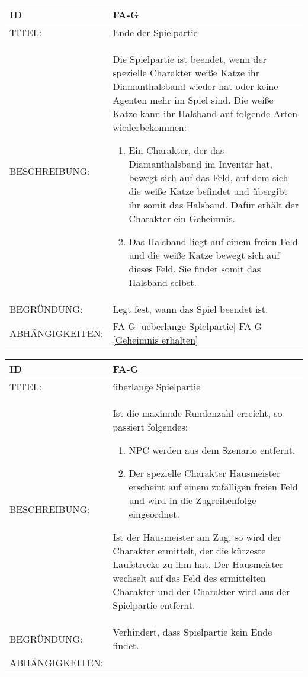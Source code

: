 \begin{tabularx}{16cm}{l|X}
	{table}\label{Ende der Spielpartie}
	\textbf{ID} & \textbf{FA-G \arabic{table}} \\
	\hline
	TITEL: & Ende der Spielpartie \\
	\hline
	BESCHREIBUNG: & Die Spielpartie ist beendet, wenn der spezielle Charakter weiße Katze ihr Diamanthalsband wieder hat oder keine Agenten mehr im Spiel sind. Die weiße Katze kann ihr Halsband auf folgende Arten wiederbekommen:
	\begin{enumerate}
		\item Ein Charakter, der das Diamanthalsband im Inventar hat, bewegt sich auf das Feld, auf dem sich die weiße Katze befindet und übergibt ihr somit das Halsband. Dafür erhält der Charakter ein Geheimnis.
		\item Das Halsband liegt auf einem freien Feld und die weiße Katze bewegt sich auf dieses Feld. Sie findet somit das Halsband selbst.
	\end{enumerate}\\
	\hline
	BEGRÜNDUNG: & Legt fest, wann das Spiel beendet ist. \\
	\hline
	ABHÄNGIGKEITEN: & FA-G \ref{ueberlange Spielpartie} FA-G \ref{Geheimnis erhalten} \\
\end{tabularx}

\begin{tabularx}{16cm}{l|X}
	{table}\label{ueberlange Spielpartie}
	\textbf{ID} & \textbf{FA-G \arabic{table}} \\
	\hline
	TITEL: & überlange Spielpartie \\
	\hline
	BESCHREIBUNG: & Ist die maximale Rundenzahl erreicht, so passiert folgendes:
	\begin{enumerate}
		\item NPC werden aus dem Szenario entfernt.
		\item Der spezielle Charakter Hausmeister erscheint auf einem zufälligen freien Feld und wird in die Zugreihenfolge eingeordnet.
	\end{enumerate}
	Ist der Hausmeister am Zug, so wird der Charakter ermittelt, der die kürzeste Laufstrecke zu ihm hat. Der Hausmeister wechselt auf das Feld des ermittelten Charakter und der Charakter wird aus der Spielpartie entfernt.\\
	\hline
	BEGRÜNDUNG: & Verhindert, dass Spielpartie kein Ende findet. \\
	\hline
	ABHÄNGIGKEITEN: &  \\
\end{tabularx}

